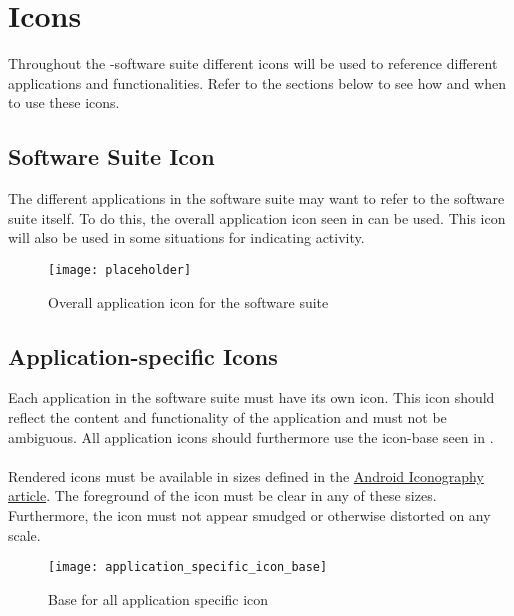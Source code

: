 
\chapter{Icons}

Throughout the \giraf-software suite different icons will be used to reference different applications and functionalities. Refer to the sections below to see how and when to use these icons.

\section{\giraf Software Suite Icon}
The different applications in the \giraf software suite may want to refer to the software suite itself. To do this, the overall application icon seen in  can be used. This icon will also be used in some situations for indicating activity. 

\begin{figure}[h]
	\centering
	\texttt{[image: placeholder]}
	\caption{Overall application icon for the \giraf software suite}
	\label{fig:overall_application_icon}
\end{figure}

\section{Application-specific Icons}
Each application in the \giraf software suite must have its own icon. This icon should reflect the content and functionality of the application and must not be ambiguous. All application icons should furthermore use the icon-base seen in . 
\\\\
Rendered icons must be available in sizes defined in the \href{http://developer.android.com/design/style/iconography.html}{Android Iconography article}. The foreground of the icon must be clear in any of these sizes. Furthermore, the icon must not appear smudged or otherwise distorted on any scale.

\begin{figure}[h]
	\centering
	\texttt{[image: application\_specific\_icon\_base]}
	\caption{Base for all application specific icon}
	\label{fig:application_specific_icon_base}
\end{figure}

